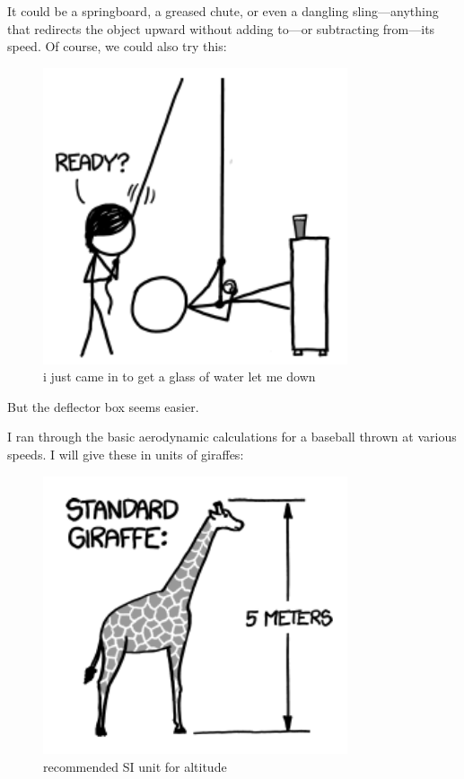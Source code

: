 {{It could be a springboard, a greased chute, or even a dangling sling—anything that redirects the object upward without adding to—or subtracting from—its speed. Of course, we could also try this:}

\begin{figure}[!htbp]
\centering
\includegraphics[scale=0.5, max width=0.8\textwidth]{imgs/a/44/high_throw_gravity.png}
\caption{i just came in to get a glass of water let me down}
\end{figure}

{But the deflector box seems easier.}

{I ran through the basic aerodynamic calculations for a baseball thrown at various speeds. I will give these in units of giraffes:}

\begin{figure}[!htbp]
\centering
\includegraphics[scale=0.5, max width=0.8\textwidth]{imgs/a/44/high_throw_giraffe.png}
\caption{recommended SI unit for altitude}
\end{figure}

}

